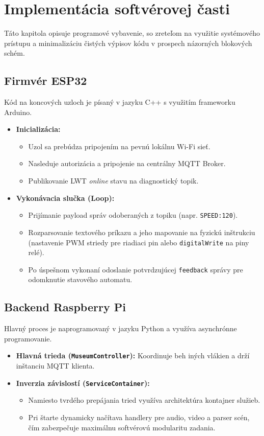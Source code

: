 \chapter{Implementácia softvérovej časti}
\label{ImplementaciaSW}

Táto kapitola opisuje programové vybavenie, so zreteľom na využitie systémového prístupu a minimalizáciu čistých výpisov kódu v prospech názorných blokových schém.

\section{Firmvér ESP32}
\label{FirmverESP32}

Kód na koncových uzloch je písaný v jazyku C++ s využitím frameworku Arduino.
\begin{itemize}
    \item \textbf{Inicializácia:} 
    \begin{itemize}
        \item Uzol sa prebúdza pripojením na pevnú lokálnu Wi-Fi sieť.
        \item Nasleduje autorizácia a pripojenie na centrálny MQTT Broker.
        \item Publikovanie LWT \textit{online} stavu na diagnostický topik.
    \end{itemize}
    \item \textbf{Vykonávacia slučka (Loop):}
    \begin{itemize}
        \item Prijímanie payload správ odoberaných z topiku (napr. \texttt{SPEED:120}).
        \item Rozparsovanie textového príkazu a jeho mapovanie na fyzickú inštrukciu (nastavenie PWM striedy pre riadiaci pin alebo \texttt{digitalWrite} na piny relé).
        \item Po úspešnom vykonaní odoslanie potvrdzujúcej \texttt{feedback} správy pre odomknutie stavového automatu.
    \end{itemize}
\end{itemize}

\section{Backend Raspberry Pi}
\label{BackendRPI}

Hlavný proces je naprogramovaný v jazyku Python a využíva asynchrónne programovanie.
\begin{itemize}
    \item \textbf{Hlavná trieda (\texttt{MuseumController}):} Koordinuje beh iných vlákien a drží inštanciu MQTT klienta.
    \item \textbf{Inverzia závislostí (\texttt{ServiceContainer}):} 
    \begin{itemize}
        \item Namiesto tvrdého prepájania tried využíva architektúra kontajner služieb.
        \item Pri štarte dynamicky načítava handlery pre audio, video a parser scén, čím zabezpečuje maximálnu softvérovú modularitu zadania.
    \end{itemize}
\end{itemize}

